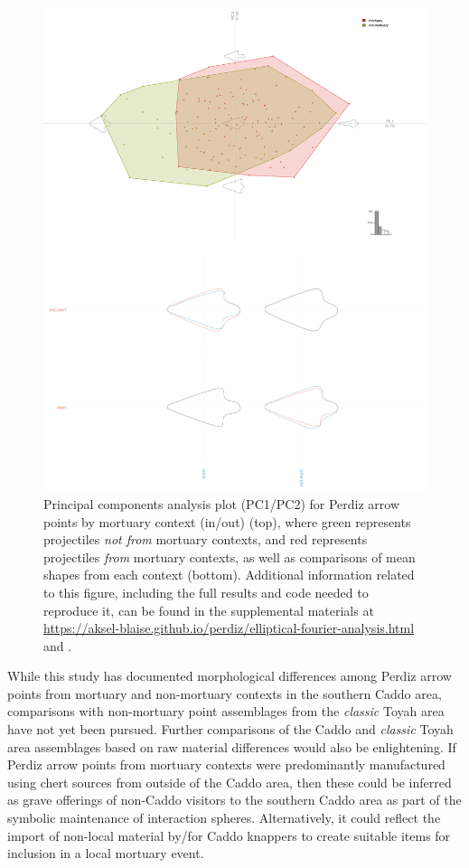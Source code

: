 \documentclass[review]{elsarticle}
\begin{document}
\begin{figure}[!]\centering
\includegraphics[width=\linewidth]{context.pdf}
\caption{Principal components analysis plot (PC1/PC2) for Perdiz arrow points by mortuary context (in/out) (top), where green represents projectiles \textit{not from} mortuary contexts, and red represents projectiles \textit{from} mortuary contexts, as well as comparisons of mean shapes from each context (bottom). Additional information related to this figure, including the full results and code needed to reproduce it, can be found in the supplemental materials at \href{https://aksel-blaise.github.io/perdiz/elliptical-fourier-analysis.html}{https://aksel-blaise.github.io/perdiz/elliptical-fourier-analysis.html} and \citealp{RN8980}.}
\label{fig:gmcontext}
\end{figure}

While this study has documented morphological differences among Perdiz arrow points from mortuary and non-mortuary contexts in the southern Caddo area, comparisons with non-mortuary point assemblages from the \textit{classic} Toyah area have not yet been pursued. Further comparisons of the Caddo and \textit{classic} Toyah area assemblages based on raw material differences would also be enlightening. If Perdiz arrow points from mortuary contexts were predominantly manufactured using chert sources from outside of the Caddo area, then these could be inferred as grave offerings of non-Caddo visitors to the southern Caddo area as part of the symbolic maintenance of interaction spheres. Alternatively, it could reflect the import of non-local material by/for Caddo knappers to create suitable items for inclusion in a local mortuary event.
\end{document}
